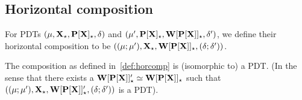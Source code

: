 \subsection{Horizontal composition}\label{sec:semfunccomp}\label{sub:hcsyn}
\begin{definition}\label{def:horcomp}
For PDTs 
$\pdtsp{\mu}{\delta}{\thr{X_\cons}}{\thr{P[X]_\cons}}$ and
$\pdtsp{\mu'}{\delta'}{\thr{P[X]_\cons}}{\thr{W[P[X]]_\cons}}$,
we define their horizontal composition to be $\pdtsp{(\mu;\mu')}{(\delta;\delta')}{\thr
X_\cons}{\thr{W[P[X]]_\cons}}$. 
\end{definition}
%
\begin{proposition}\label{prop:horcomp}
The composition as defined in~\ref{def:horcomp} is (isomorphic to) a PDT. (In
the sense that there exists a $\thr{W[P[X]]'_\cons}\iso\thr{W[P[X]]_\cons}$
such that $\pdtsp{(\mu;\mu')}{(\delta;\delta')}{\thr
X_\cons}{\thr{W[P[X]]'_\cons}}$ is a PDT).
\end{proposition}
